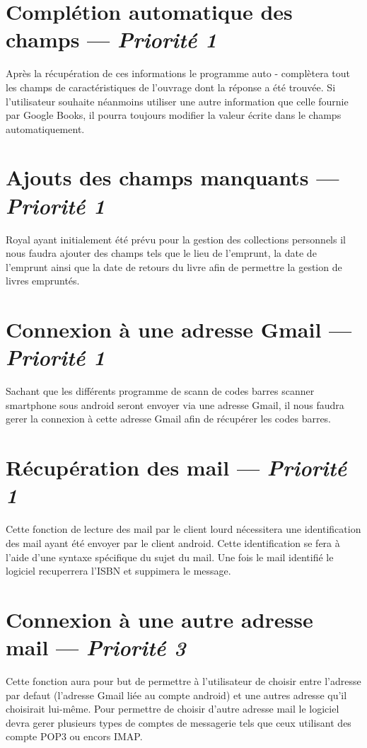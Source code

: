 \section[Complétion automatique des champs]{Complétion automatique des champs — \emph{Priorité 1}}
Après la récupération de ces informations le programme auto - complètera tout les champs de caractéristiques de l'ouvrage dont la réponse a été trouvée.
Si l'utilisateur souhaite néanmoins utiliser une autre information que celle fournie par Google Books, il pourra toujours modifier la valeur écrite dans le champs automatiquement.

\section[Ajouts des champs manquants]{Ajouts des champs manquants — \emph{Priorité 1}}
Royal ayant initialement été prévu pour la gestion des collections personnels il nous faudra ajouter des champs tels que le lieu de l'emprunt, la date de l'emprunt ainsi que la date de retours du livre afin de permettre la gestion de livres empruntés. 

\section[Connexion à une adresse Gmail]{Connexion à une adresse Gmail — \emph{Priorité 1}} 
Sachant que les différents programme de scann de codes barres scanner smartphone sous android seront envoyer via une adresse Gmail, il nous faudra gerer la connexion à cette adresse Gmail afin de récupérer les codes barres.

\section[Récupération des mail]{Récupération des mail — \emph{Priorité 1}} 
Cette fonction de lecture des mail par le client lourd nécessitera une identification des mail ayant été envoyer par le client android. Cette identification se fera à l'aide d'une syntaxe spécifique du sujet du mail. Une fois le mail identifié le logiciel recuperrera l'ISBN et suppimera le message. 




\section[Connexion à une autre adresse mail]{Connexion à une autre adresse mail — \emph{Priorité 3}}
Cette fonction aura pour but de permettre à l'utilisateur de choisir entre l'adresse par defaut (l'adresse Gmail liée au compte android) et une autres adresse qu'il choisirait lui-même. Pour permettre de choisir d'autre adresse mail le logiciel devra gerer plusieurs types de comptes de messagerie tels que ceux utilisant des compte POP3 ou encors IMAP.

